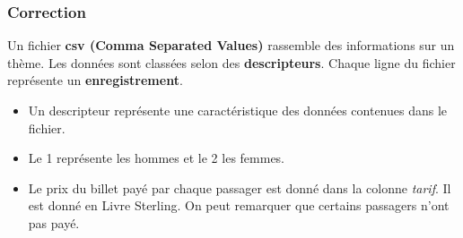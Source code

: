 \documentclass[svgnames,11pt]{beamer}
\begin{document}
\begin{frame}
    \frametitle{Correction}
\begin{aretenir}[]
Un fichier \textbf{csv (Comma Separated Values)} rassemble des informations sur un thème. Les données sont classées selon des \textbf{descripteurs}. Chaque ligne du fichier représente un \textbf{enregistrement}.
\end{aretenir}
    \begin{itemize}
        \item Un descripteur représente une caractéristique des données contenues dans le fichier.
        \item Le 1 représente les hommes et le 2 les femmes.
        \item Le prix du billet payé par chaque passager est donné dans la colonne \emph{tarif}. Il est donné en Livre Sterling. On peut remarquer que certains passagers n'ont pas payé.
    \end{itemize}

\end{frame}
\end{document}
